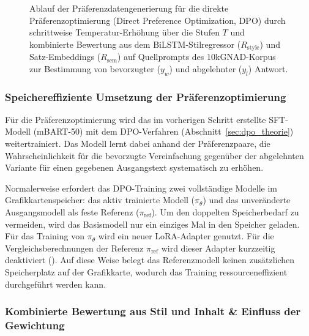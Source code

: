 \begin{figure}[H]
\caption[Ablauf der DPO-Präferenzdatengenerierung]{Ablauf der Präferenzdatengenerierung für die direkte Präferenzoptimierung (Direct Preference Optimization, DPO) durch schrittweise Temperatur-Erhöhung über die Stufen $T$ und kombinierte Bewertung aus dem BiLSTM-Stilregressor ($R_{\text{style}}$) und Satz-Embeddings ($R_{\text{sem}}$) auf Quellprompts des 10kGNAD-Korpus zur Bestimmung von bevorzugter ($y_w$) und abgelehnter ($y_l$) Antwort.}
\label{fig:dpo_temperature_ladder_workflow}
\end{figure}

\subsubsection{Speichereffiziente Umsetzung der Präferenzoptimierung}
\label{sec:dpo_architektur_engine}

Für die Präferenzoptimierung wird das im vorherigen Schritt erstellte SFT-Modell (mBART-50) mit dem DPO-Verfahren (Abschnitt~\ref{sec:dpo_theorie}) weitertrainiert. Das Modell lernt dabei anhand der Präferenzpaare, die Wahrscheinlichkeit für die bevorzugte Vereinfachung gegenüber der abgelehnten Variante für einen gegebenen Ausgangstext systematisch zu erhöhen.

Normalerweise erfordert das DPO-Training zwei vollständige Modelle im Grafikkartenspeicher: das aktiv trainierte Modell ($\pi_\theta$) und das unveränderte Ausgangsmodell als feste Referenz ($\pi_{\text{ref}}$). Um den doppelten Speicherbedarf zu vermeiden, wird das Basismodell nur ein einziges Mal in den Speicher geladen. Für das Training von $\pi_\theta$ wird ein neuer LoRA-Adapter genutzt. Für die Vergleichsberechnungen der Referenz $\pi_{\text{ref}}$ wird dieser Adapter kurzzeitig deaktiviert (). Auf diese Weise belegt das Referenzmodell keinen zusätzlichen Speicherplatz auf der Grafikkarte, wodurch das Training ressourceneffizient durchgeführt werden kann.

\subsubsection{Kombinierte Bewertung aus Stil und Inhalt \& Einfluss der Gewichtung}
\label{sec:dpo_reward_design}

